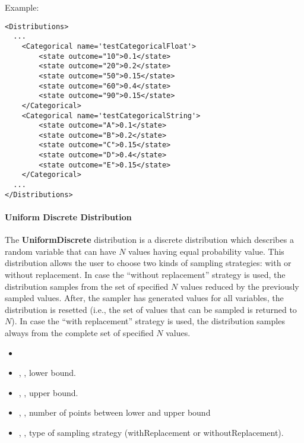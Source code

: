 Example:
\begin{lstlisting}[style=XML]
<Distributions>
  ...
    <Categorical name='testCategoricalFloat'>
        <state outcome="10">0.1</state>
        <state outcome="20">0.2</state>
        <state outcome="50">0.15</state>
        <state outcome="60">0.4</state>
        <state outcome="90">0.15</state>
    </Categorical>
    <Categorical name='testCategoricalString'>
        <state outcome="A">0.1</state>
        <state outcome="B">0.2</state>
        <state outcome="C">0.15</state>
        <state outcome="D">0.4</state>
        <state outcome="E">0.15</state>
    </Categorical>
  ...
</Distributions>
\end{lstlisting}

\paragraph{Uniform Discrete Distribution}
\label{subsec:UniformDiscrete}

The \textbf{UniformDiscrete} distribution is a discrete distribution which describes a random variable
that can have $N$ values having equal probability value.
This distribution allows the user to choose two kinds of sampling strategies: with or without replacement.
In case the ``without replacement'' strategy is used, the distribution samples from the set of specified $N$ values
reduced by the previously sampled values.
After, the sampler has generated values for all variables, the distribution is
resetted (i.e., the set of values that can be sampled is returned to $N$).
In case the ``with replacement'' strategy is used, the distribution samples always from the complete set of specified $N$ values.

%
\attrIntro
\vspace{-5mm}
\begin{itemize}
  \itemsep0em
  \item \nameDescription
\end{itemize}
\vspace{-5mm}
\subnodeIntro
\begin{itemize}
  \item {}, , lower bound.
  \item {}, , upper bound.
  \item {},    , number of points between lower and upper bound
  \item {},   , type of sampling strategy
  (withReplacement or withoutReplacement).
\end{itemize}

